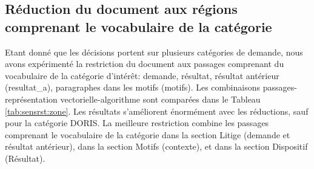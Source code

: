 \subsection{Réduction du document aux régions comprenant le vocabulaire de la catégorie}
Etant donné que les décisions portent sur plusieurs catégories de demande, nous avons expérimenté la restriction du document aux passages comprenant du vocabulaire de la catégorie d'intérêt: demande, résultat, résultat antérieur (resultat\_a), paragraphes dans les motifs (motifs). Les combinaisons passages-représentation vectorielle-algorithme sont comparées dans le Tableau \ref{tab:sensrst:zone}. Les résultats s'améliorent énormément  avec les réductions, sauf pour la catégorie DORIS. La meilleure restriction combine les passages comprenant le vocabulaire de la catégorie dans la section Litige (demande et résultat antérieur),  dans la section Motifs (contexte), et dans la section Dispositif (Résultat).
